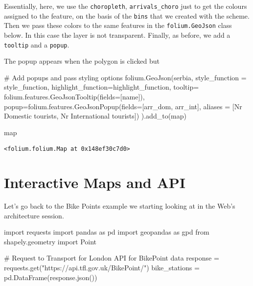 \documentclass[
  letterpaper,
  DIV=11,
  numbers=noendperiod]{scrreprt}
\newenvironment{Shaded}{\begin{snugshade}}{\end{snugshade}}
\newcommand{\BuiltInTok}[1]{\textcolor[rgb]{0.00,0.23,0.31}{#1}}
\newcommand{\CommentTok}[1]{\textcolor[rgb]{0.37,0.37,0.37}{#1}}
\newcommand{\ImportTok}[1]{\textcolor[rgb]{0.00,0.46,0.62}{#1}}
\newcommand{\NormalTok}[1]{\textcolor[rgb]{0.00,0.23,0.31}{#1}}
\newcommand{\OperatorTok}[1]{\textcolor[rgb]{0.37,0.37,0.37}{#1}}
\newcommand{\StringTok}[1]{\textcolor[rgb]{0.13,0.47,0.30}{#1}}
\begin{document}
Essentially, here, we use the \texttt{choropleth},
\texttt{arrivals\_choro} just to get the colours assigned to the
feature, on the basis of the \texttt{bins} that we created with the
scheme. Then we pass these colors to the same features in the
\texttt{folium.GeoJson} class below. In this case the layer is not
transparent. Finally, as before, we add a \texttt{tooltip} and a
\texttt{popup}.

The popup appears when the polygon is clicked but

\begin{Shaded}
\begin{Highlighting}[]
\CommentTok{\# Add popups and pass styling options}
\NormalTok{folium.GeoJson(serbia, style\_function }\OperatorTok{=}\NormalTok{ style\_function, }
\NormalTok{               highlight\_function}\OperatorTok{=}\NormalTok{highlight\_function, }
\NormalTok{               tooltip}\OperatorTok{=}\NormalTok{ folium.features.GeoJsonTooltip(fields}\OperatorTok{=}\NormalTok{[}\StringTok{\textquotesingle{}name\textquotesingle{}}\NormalTok{]), }
\NormalTok{               popup}\OperatorTok{=}\NormalTok{folium.features.GeoJsonPopup(fields}\OperatorTok{=}\NormalTok{[}\StringTok{\textquotesingle{}arr\_dom\textquotesingle{}}\NormalTok{, }\StringTok{\textquotesingle{}arr\_int\textquotesingle{}}\NormalTok{], aliases }\OperatorTok{=}\NormalTok{ [}\StringTok{\textquotesingle{}Nr Domestic tourists\textquotesingle{}}\NormalTok{, }\StringTok{\textquotesingle{}Nr International tourists\textquotesingle{}}\NormalTok{])}
\NormalTok{    ).add\_to(}\BuiltInTok{map}\NormalTok{)}

\BuiltInTok{map}
\end{Highlighting}
\end{Shaded}

\begin{verbatim}
<folium.folium.Map at 0x148ef30c7d0>
\end{verbatim}

\section{Interactive Maps and API}\label{interactive-maps-and-api}

Let's go back to the Bike Points example we starting looking at in the
Web's architecture session.

\begin{Shaded}
\begin{Highlighting}[]
\ImportTok{import}\NormalTok{ requests}
\ImportTok{import}\NormalTok{ pandas }\ImportTok{as}\NormalTok{ pd}
\ImportTok{import}\NormalTok{ geopandas }\ImportTok{as}\NormalTok{ gpd}
\ImportTok{from}\NormalTok{ shapely.geometry }\ImportTok{import}\NormalTok{ Point}

\CommentTok{\# Request to Transport for London API for BikePoint data}
\NormalTok{response }\OperatorTok{=}\NormalTok{ requests.get(}\StringTok{"https://api.tfl.gov.uk/BikePoint/"}\NormalTok{)}
\NormalTok{bike\_stations }\OperatorTok{=}\NormalTok{ pd.DataFrame(response.json())}
\end{Highlighting}
\end{Shaded}
\end{document}
